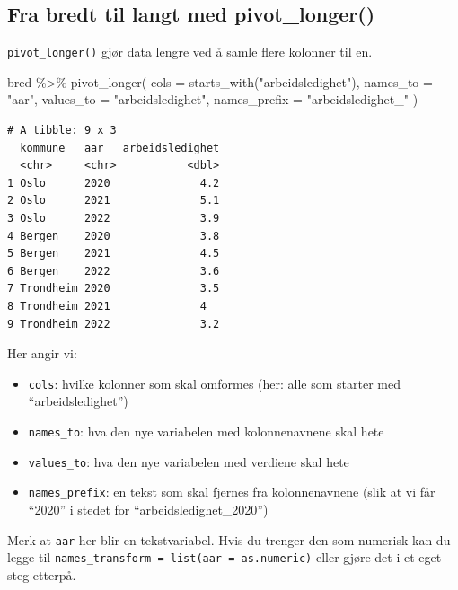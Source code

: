 \documentclass[
  norsk,
  letterpaper,
  DIV=11,
  numbers=noendperiod]{scrreprt}
\newenvironment{Shaded}{\begin{snugshade}}{\end{snugshade}}
\newcommand{\AttributeTok}[1]{\textcolor[rgb]{0.40,0.45,0.13}{#1}}
\newcommand{\FunctionTok}[1]{\textcolor[rgb]{0.28,0.35,0.67}{#1}}
\newcommand{\NormalTok}[1]{\textcolor[rgb]{0.00,0.23,0.31}{#1}}
\newcommand{\SpecialCharTok}[1]{\textcolor[rgb]{0.37,0.37,0.37}{#1}}
\newcommand{\StringTok}[1]{\textcolor[rgb]{0.13,0.47,0.30}{#1}}
\providecommand{\tightlist}{%
  \setlength{\itemsep}{0pt}\setlength{\parskip}{0pt}}
\theoremstyle{definition}
\theoremstyle{remark}
\begin{document}
\subsection{Fra bredt til langt med
pivot\_longer()}\label{fra-bredt-til-langt-med-pivot_longer}

\texttt{pivot\_longer()} gjør data lengre ved å samle flere kolonner til
en.

\begin{Shaded}
\begin{Highlighting}[]
\NormalTok{bred }\SpecialCharTok{\%\textgreater{}\%}
  \FunctionTok{pivot\_longer}\NormalTok{(}
    \AttributeTok{cols =} \FunctionTok{starts\_with}\NormalTok{(}\StringTok{"arbeidsledighet"}\NormalTok{),}
    \AttributeTok{names\_to =} \StringTok{"aar"}\NormalTok{,}
    \AttributeTok{values\_to =} \StringTok{"arbeidsledighet"}\NormalTok{,}
    \AttributeTok{names\_prefix =} \StringTok{"arbeidsledighet\_"}
\NormalTok{  )}
\end{Highlighting}
\end{Shaded}

\begin{verbatim}
# A tibble: 9 x 3
  kommune   aar   arbeidsledighet
  <chr>     <chr>           <dbl>
1 Oslo      2020              4.2
2 Oslo      2021              5.1
3 Oslo      2022              3.9
4 Bergen    2020              3.8
5 Bergen    2021              4.5
6 Bergen    2022              3.6
7 Trondheim 2020              3.5
8 Trondheim 2021              4  
9 Trondheim 2022              3.2
\end{verbatim}

Her angir vi:

\begin{itemize}
\tightlist
\item
  \texttt{cols}: hvilke kolonner som skal omformes (her: alle som
  starter med ``arbeidsledighet'')
\item
  \texttt{names\_to}: hva den nye variabelen med kolonnenavnene skal
  hete
\item
  \texttt{values\_to}: hva den nye variabelen med verdiene skal hete
\item
  \texttt{names\_prefix}: en tekst som skal fjernes fra kolonnenavnene
  (slik at vi får ``2020'' i stedet for ``arbeidsledighet\_2020'')
\end{itemize}

Merk at \texttt{aar} her blir en tekstvariabel. Hvis du trenger den som
numerisk kan du legge til
\texttt{names\_transform\ =\ list(aar\ =\ as.numeric)} eller gjøre det i
et eget steg etterpå.
\end{document}
